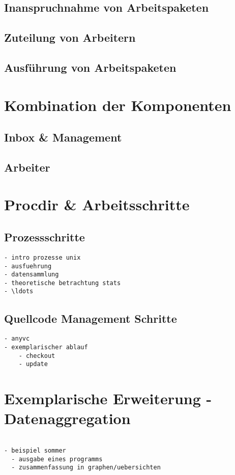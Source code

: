 \subsection{Inanspruchnahme von Arbeitspaketen}

\subsection{Zuteilung von Arbeitern}

\subsection{Ausführung von Arbeitspaketen}


\section{Kombination der Komponenten}
\subsection{Inbox \& Management}
\subsection{Arbeiter}

\section{Procdir \& Arbeitsschritte}

\subsection{Prozessschritte}

\begin{verbatim}
- intro prozesse unix
- ausfuehrung
- datensammlung
- theoretische betrachtung stats
- \ldots
\end{verbatim}

\subsection{Quellcode Management Schritte}


\begin{verbatim}
- anyvc
- exemplarischer ablauf
    - checkout
    - update
\end{verbatim}

\section{Exemplarische Erweiterung - Datenaggregation}

 
\begin{verbatim}

- beispiel sommer
  - ausgabe eines programms
  - zusammenfassung in graphen/uebersichten

\end{verbatim}

